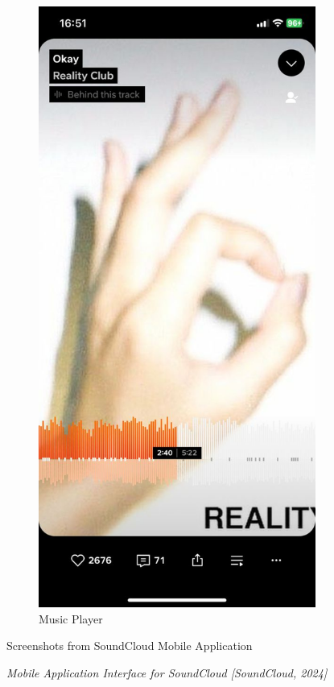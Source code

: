 \begin{figure} [h]
\begin{subfigure}{.3\linewidth}
  \end{subfigure}%
    \hspace{1em}%
    \begin{subfigure}{.3\linewidth}
      \centering
      \includegraphics[width = \linewidth]{mainmatter/images/soundcloud3.jpg}
      \caption{Music Player}
      \label{fig:myfig28}
    \end{subfigure}
    \caption{Screenshots from SoundCloud Mobile Application}
    \caption*{\textit{Mobile Application Interface for SoundCloud [SoundCloud, 2024]}}
\end{figure}

